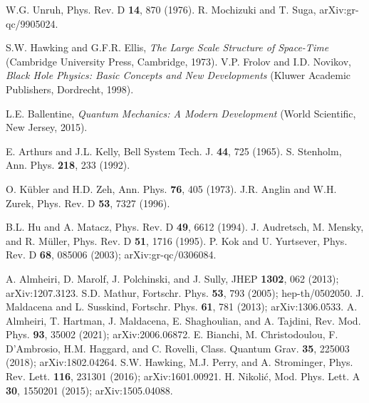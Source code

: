 \documentclass[aps,prd,onecolumn,groupedaddress,showkeys,12pt]{revtex4-2}
\begin{document}
\begin{thebibliography}{99}
W.G. Unruh, Phys. Rev. D {\bf 14}, 870 (1976).
R. Mochizuki and T. Suga, arXiv:gr-qc/9905024.

S.W. Hawking and G.F.R. Ellis, {\it The Large Scale Structure of Space-Time}
(Cambridge University Press, Cambridge, 1973).
V.P. Frolov and I.D. Novikov, {\it Black Hole Physics: Basic Concepts and New Developments}
(Kluwer Academic Publishers, Dordrecht, 1998).

L.E. Ballentine, {\it Quantum Mechanics: A Modern Development} (World Scientific, New Jersey, 2015).

E. Arthurs and J.L. Kelly, Bell System Tech. J. {\bf 44}, 725 (1965). 
S. Stenholm, Ann. Phys. {\bf 218}, 233 (1992).

O. K\"ubler and H.D. Zeh, Ann. Phys. {\bf 76}, 405 (1973).
J.R. Anglin and W.H. Zurek, Phys. Rev. D {\bf 53}, 7327 (1996).

B.L. Hu and A. Matacz, Phys. Rev. D {\bf 49}, 6612 (1994).
J. Audretsch, M. Mensky, and R. M\"uller, Phys. Rev. D {\bf 51}, 1716 (1995).
P. Kok and U. Yurtsever, Phys. Rev. D {\bf 68}, 085006 (2003); arXiv:gr-qc/0306084.

A. Almheiri, D. Marolf, J. Polchinski, and J. Sully, JHEP {\bf 1302}, 062 (2013); arXiv:1207.3123.
S.D. Mathur, Fortschr. Phys. {\bf 53}, 793 (2005); hep-th/0502050.
J. Maldacena and L. Susskind, Fortschr. Phys. {\bf 61}, 781 (2013); arXiv:1306.0533.
A. Almheiri, T. Hartman, J. Maldacena, E. Shaghoulian, and A. Tajdini, Rev. Mod. Phys. {\bf 93}, 35002 (2021); 
arXiv:2006.06872.
E. Bianchi, M. Christodoulou, F. D'Ambrosio, H.M. Haggard, and C. Rovelli, 
Class. Quantum Grav. {\bf 35}, 225003 (2018); arXiv:1802.04264.
S.W. Hawking, M.J. Perry, and A. Strominger, Phys. Rev. Lett. {\bf 116}, 231301 (2016); arXiv:1601.00921.
H. Nikoli\'c, Mod. Phys. Lett. A {\bf 30}, 1550201 (2015); arXiv:1505.04088.


 

\end{thebibliography}
\end{document}
